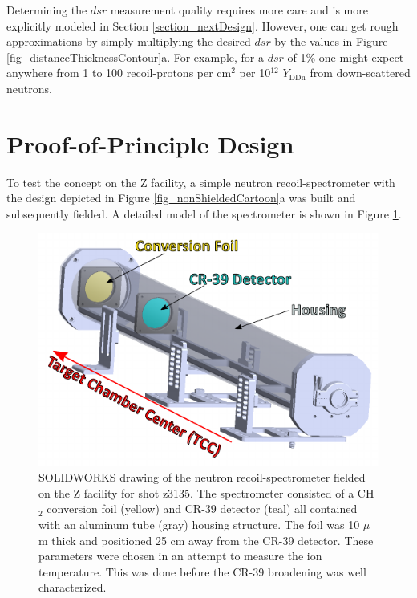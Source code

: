 Determining the $dsr$ measurement quality requires more care and is more explicitly modeled in Section \ref{section_nextDesign}. However, one can get rough approximations by simply multiplying the desired $dsr$ by the values in Figure \ref{fig_distanceThicknessContour}a. For example, for a $dsr$ of 1\% one might expect anywhere from 1 to 100 recoil-protons per cm$^2$ per 10$^{12}$ $Y_{\mathrm{DDn}}$ from down-scattered neutrons.

\section{Proof-of-Principle Design}
\label{section_proofDesigns}

To test the concept on the Z facility, a simple neutron recoil-spectrometer with the design depicted in Figure \ref{fig_nonShieldedCartoon}a was built and subsequently fielded. A detailed model of the spectrometer is shown in Figure \ref{fig_firstSpectrometer}.

\begin{figure}[h!]
	
	\centering
	\includegraphics[scale=1.5]{Figures/firstSpectrometer.pdf}
	\caption{SOLIDWORKS drawing of the neutron recoil-spectrometer fielded on the Z facility for shot z3135. The spectrometer consisted of a CH$_2$ conversion foil (yellow) and CR-39 detector (teal) all contained with an aluminum tube (gray) housing structure. The foil was 10 $\mu$m thick and positioned 25 cm away from the CR-39 detector. These parameters were chosen in an attempt to measure the ion temperature. This was done before the CR-39 broadening was well characterized.}
	\label{fig_firstSpectrometer}
	
\end{figure}

